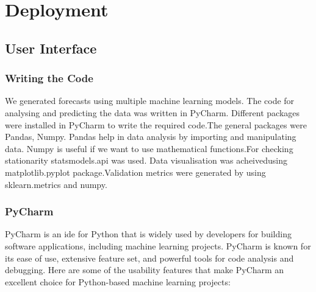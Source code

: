 %
%



\chapter{Deployment}

\section{User Interface}

\subsection{Writing the Code}

We generated forecasts using multiple machine learning models. The code for analysing and predicting the data was written in PyCharm. Different packages were installed in PyCharm to write the required code.The general packages were Pandas, Numpy. Pandas help in data analysis by importing and manipulating data. Numpy is useful if we want to use mathematical functions.For checking stationarity statsmodels.api was used. Data visualisation was acheivedusing matplotlib.pyplot package.Validation metrics were generated by using sklearn.metrics and numpy.

\subsection{PyCharm}

PyCharm is an \ac{ide} for Python that is widely used by developers for building software applications, including machine learning projects. PyCharm is known for its ease of use, extensive feature set, and powerful tools for code analysis and debugging. Here are some of the usability features that make PyCharm an excellent choice for Python-based machine learning projects:

